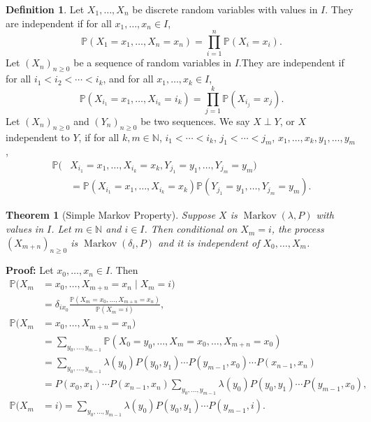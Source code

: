 \documentclass[12pt]{article}
\DeclareMathOperator{\Mkv}{Markov}
\newtheorem{theorem}{Theorem}[section]
\theoremstyle{definition}
\newtheorem{definition}{Definition}[section]
\theoremstyle{remark}
\begin{document}
\begin{definition}
	Let $X_1, \ldots, X_{n}$ be discrete random variables with values in $I$. They are independent if for all $x_1, \ldots, x_n \in I$,
	\[
		\mathbb{P}(X_1 = x_1, \ldots, X_n = x_n) = \prod_{i = 1}^{n} \mathbb{P}(X_i = x_i)
	.\]
	Let $(X_n)_{n \geq 0}$ be a sequence of random variables in $I$.They are independent if for all $i_1 < i_2 < \cdots < i_k$, and for all $x_1, \ldots, x_k \in I$,
	\[
		\mathbb{P}(X_{i_1} = x_1, \ldots, X_{i_k} = i_k) = \prod_{j = 1}^{k} \mathbb{P}(X_{i_j} = x_j)
	.\]
	Let $(X_n)_{n \geq 0}$ and $(Y_n)_{n \geq 0}$ be two sequences. We say $X \perp Y$, or $X$ independent to $Y$, if for all $k, m \in \mathbb{N}$, $i_1 < \cdots < i_k$, $j_1 < \cdots < j_m$, $x_1, \ldots, x_k, y_1, \ldots, y_m$,
	\begin{align*}
		\mathbb{P}(&X_{i_1} = x_1, \ldots, X_{i_k} = x_k, Y_{j_1} = y_1, \ldots, Y_{j_m} = y_m) \\
			   &= \mathbb{P}(X_{i_1} = x_1, \ldots, X_{i_k} = x_k) \mathbb{P}(Y_{j_1} = y_1, \ldots, Y_{j_m} = y_m)
	.\end{align*}
\end{definition}

\begin{theorem}[Simple Markov Property]
	Suppose $X$ is $\Mkv(\lambda, P)$ with values in $I$. Let $m \in \mathbb{N}$ and $i \in I$. Then conditional on $X_m = i$, the process $(X_{m+n})_{n \geq 0}$ is $\Mkv(\delta_i, P)$ and it is independent of $X_0, \ldots, X_m$.
\end{theorem}

\begin{adjustbox}{minipage = \columnwidth - 25.5pt, margin=1em, frame=1pt, margin=0em}
\textbf{Proof:} Let $x_0, \ldots, x_n \in I$. Then
\begin{align*}
	\mathbb{P}(X_m &= x_0, \ldots, X_{m+n} = x_n \mid X_m = i) \\
		       &= \delta_{ix_0} \frac{\mathbb{P}(X_m = x_0, \ldots, X_{m+n} = x_n)}{\mathbb{P}(X_m = i)}, \\
	\mathbb{P}(X_m &= x_0, \ldots, X_{m+n} = x_n) \\
		       &= \sum_{y_0,\ldots, y_{m-1}}\mathbb{P}(X_0 = y_0, \ldots, X_{m} = x_0, \ldots, X_{m+n} = x_0) \\
		       &= \sum_{y_0, \ldots, y_{m-1}} \lambda(y_0) P(y_0, y_1) \cdots P(y_{m-1}, x_0) \cdots P(x_{n-1}, x_n) \\
		       &= P(x_0, x_1) \cdots P(x_{n-1}, x_n) \sum_{y_0, \ldots, y_{m-1}} \lambda(y_0) P(y_0, y_1) \cdots P(y_{m-1}, x_0), \\
	\mathbb{P}(X_m &= i) = \sum_{y_0, \ldots, y_{m-1}} \lambda(y_0) P(y_0, y_1) \cdots P(y_{m-1}, i).
\end{align*}

\end{adjustbox}
\end{document}
